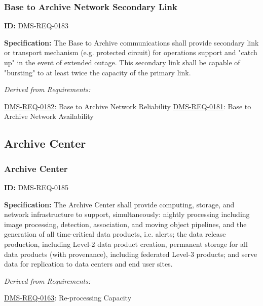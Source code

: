 \documentclass[SE,toc,lsstdraft]{lsstdoc}
\begin{document}
\subsubsection{Base to Archive Network Secondary Link}

\label{DMS-REQ-0183}
\textbf{ID:} DMS-REQ-0183

\textbf{Specification: }The Base to Archive communications shall provide secondary link or transport mechanism (e.g. protected circuit) for operations support and "catch up"  in the event of extended outage.  This secondary link shall be capable of "bursting" to at least twice the capacity of the primary link.






\emph{Derived from Requirements:}

\hyperref[DMS-REQ-0182]{DMS-REQ-0182}:
Base to Archive Network Reliability \newline
\hyperref[DMS-REQ-0181]{DMS-REQ-0181}:
Base to Archive Network Availability \newline


\subsection{Archive Center}





\subsubsection{Archive Center}

\label{DMS-REQ-0185}
\textbf{ID:} DMS-REQ-0185

\textbf{Specification:} The Archive Center shall provide computing, storage, and network infrastructure to support, simultaneously: nightly processing including image processing, detection, association, and moving object pipelines, and the generation of all time-critical data products, i.e. alerts; the data release production, including Level-2 data product creation, permanent storage for all data products (with provenance), including federated Level-3 products; and serve data for replication to data centers and end user sites.






\emph{Derived from Requirements:}

\hyperref[DMS-REQ-0163]{DMS-REQ-0163}:
Re-processing Capacity \newline
\end{document}
